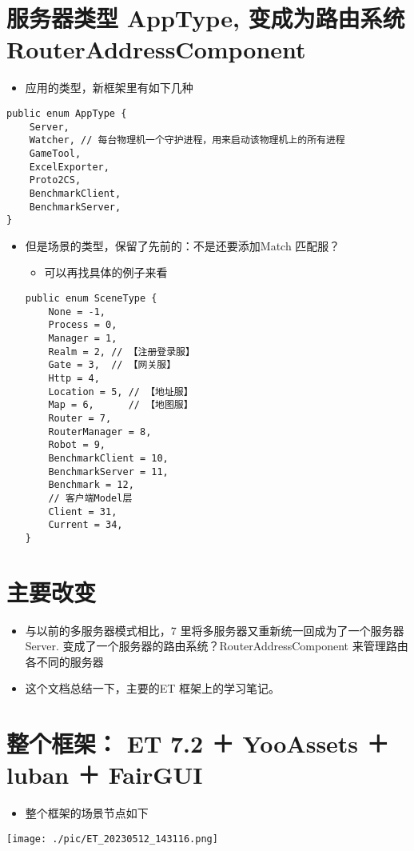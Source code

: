 \documentclass[9pt, b5paper]{article}
\begin{document}
\section{服务器类型 AppType, 变成为路由系统 RouterAddressComponent}
\label{sec:orgad3019e}
\begin{itemize}
\item 应用的类型，新框架里有如下几种
\end{itemize}
\begin{verbatim}
public enum AppType {
    Server,
    Watcher, // 每台物理机一个守护进程，用来启动该物理机上的所有进程
    GameTool,
    ExcelExporter,
    Proto2CS,
    BenchmarkClient,
    BenchmarkServer,
}
\end{verbatim}
\begin{itemize}
\item 但是场景的类型，保留了先前的：不是还要添加Match 匹配服？
\begin{itemize}
\item 可以再找具体的例子来看
\end{itemize}
\begin{verbatim}
public enum SceneType {
    None = -1,
    Process = 0,
    Manager = 1,
    Realm = 2, // 【注册登录服】
    Gate = 3,  // 【网关服】
    Http = 4,
    Location = 5, // 【地址服】
    Map = 6,      // 【地图服】
    Router = 7,
    RouterManager = 8,
    Robot = 9,
    BenchmarkClient = 10,
    BenchmarkServer = 11,
    Benchmark = 12,
    // 客户端Model层
    Client = 31,
    Current = 34,
}
\end{verbatim}
\end{itemize}

\section{主要改变}
\label{sec:orgc4b3f0f}
\begin{itemize}
\item 与以前的多服务器模式相比，7 里将多服务器又重新统一回成为了一个服务器Server. 变成了一个服务器的路由系统？RouterAddressComponent 来管理路由各不同的服务器
\item 这个文档总结一下，主要的ET 框架上的学习笔记。
\end{itemize}

\section{整个框架： ET 7.2 ＋ YooAssets ＋ luban ＋ FairGUI}
\label{sec:org2272558}
\begin{itemize}
\item 整个框架的场景节点如下
\end{itemize}

\begin{center}
\texttt{[image: ./pic/ET\_20230512\_143116.png]}
\end{center}
\end{document}
